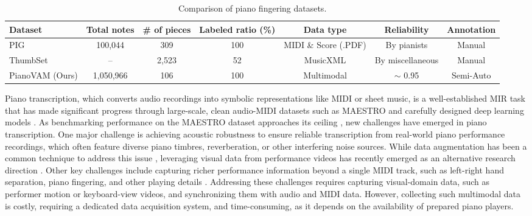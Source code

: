 \documentclass{article}
\begin{document}
\begin{table}
    \centering

    \small
    \begin{tabular}{lcccccc}
        \toprule
        \textbf{Dataset}  & \textbf{Total notes} & \textbf{\# of pieces} & \textbf{Labeled ratio (\%)} & \textbf{Data type} & \textbf{Reliability} & \textbf{Annotation} \\
        \midrule
        PIG \cite{InfoSci20Nakamura} & 100,044 & 309 & 100 & MIDI \& Score (.PDF) & By pianists & Manual \\
        ThumbSet \cite{MM22Ramoneda} & -- & 2,523 & 52 & MusicXML & By miscellaneous & Manual \\
        PianoVAM (Ours) & 1,050,966 & 106 & 100 & Multimodal & $\sim$ 0.95 & Semi-Auto \\
        \bottomrule
    \end{tabular}
\vspace{-2mm}    
\caption{Comparison of piano fingering datasets.}
    \label{tab:fingering-datasets}
\vspace{-2mm}    
\end{table}

Piano transcription, which converts audio recordings into symbolic representations like MIDI or sheet music, is a well-established MIR task that has made significant progress through large-scale, clean audio-MIDI datasets such as MAESTRO \cite{ISMIR18Hawthorne} and carefully designed deep learning models \cite{TASLP21Kong, ISMIR22Wei}. As benchmarking performance on the MAESTRO dataset approaches its ceiling \cite{ISMIR24Yan}, new challenges have emerged in piano transcription. One major challenge is achieving acoustic robustness to ensure reliable transcription from real-world piano performance recordings, which often feature diverse piano timbres, reverberation, or other interfering noise sources. While data augmentation has been a common technique to address this issue \cite{ICLR19Hawthorne, Edwards2024}, leveraging visual data from performance videos has recently emerged as an alternative research direction \cite{CJE15Wan, DAFx21Wang, ICASSPW23Li, TASLP24Li}. Other key challenges include capturing richer performance information beyond a single MIDI track, such as left-right hand separation, piano fingering, and other playing details \cite{InfoSci20Nakamura, MM22Ramoneda}. Addressing these challenges requires capturing visual-domain data, such as performer motion or keyboard-view videos, and synchronizing them with audio and MIDI data. However, collecting such multimodal data is costly, requiring a dedicated data acquisition system, and time-consuming, as it depends on the availability of prepared piano players. 
\end{document}
